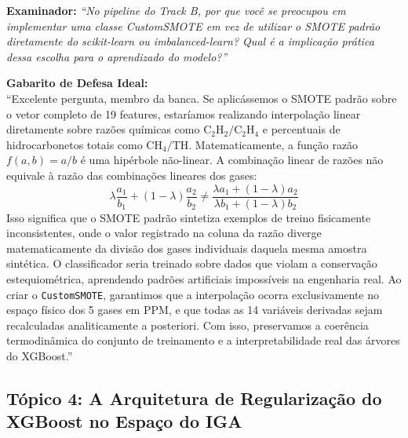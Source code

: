 \documentclass[10pt,a4paper]{article}
\begin{document}
\begin{alertbox}
\textbf{Examinador:} \textit{``No pipeline do Track B, por que você se preocupou em implementar uma classe CustomSMOTE em vez de utilizar o SMOTE padrão diretamente do scikit-learn ou imbalanced-learn? Qual é a implicação prática dessa escolha para o aprendizado do modelo?''}

\textbf{Gabarito de Defesa Ideal:}\\
``Excelente pergunta, membro da banca. Se aplicássemos o SMOTE padrão sobre o vetor completo de 19 features, estaríamos realizando interpolação linear diretamente sobre razões químicas como $\text{C}_2\text{H}_2/\text{C}_2\text{H}_4$ e percentuais de hidrocarbonetos totais como $\text{CH}_4/\text{TH}$.
Matematicamente, a função razão $f(a, b) = a/b$ é uma hipérbole não-linear. A combinação linear de razões não equivale à razão das combinações lineares dos gases:
$$\lambda \frac{a_1}{b_1} + (1-\lambda) \frac{a_2}{b_2} \neq \frac{\lambda a_1 + (1-\lambda) a_2}{\lambda b_1 + (1-\lambda) b_2}$$
Isso significa que o SMOTE padrão sintetiza exemplos de treino fisicamente inconsistentes, onde o valor registrado na coluna da razão diverge matematicamente da divisão dos gases individuais daquela mesma amostra sintética.
O classificador seria treinado sobre dados que violam a conservação estequiométrica, aprendendo padrões artificiais impossíveis na engenharia real.
Ao criar o \texttt{CustomSMOTE}, garantimos que a interpolação ocorra exclusivamente no espaço físico dos 5 gases em PPM, e que todas as 14 variáveis derivadas sejam recalculadas analiticamente a posteriori. Com isso, preservamos a coerência termodinâmica do conjunto de treinamento e a interpretabilidade real das árvores do XGBoost.''
\end{alertbox}

\subsection{Tópico 4: A Arquitetura de Regularização do XGBoost no Espaço do IGA}
\end{document}
